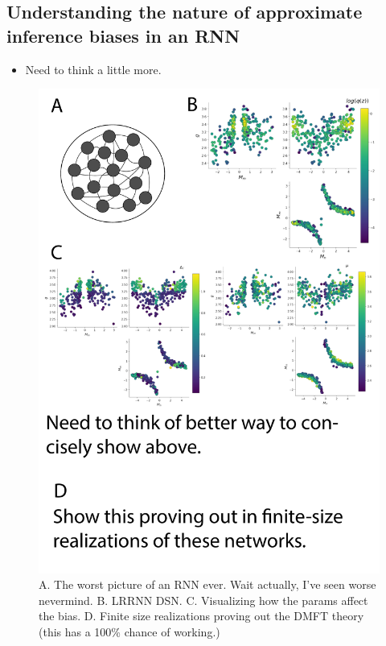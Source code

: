 \documentclass[11pt]{article}
\begin{document}
\subsection{Understanding the nature of approximate inference biases in an RNN}
\begin{itemize}
\item Need to think a little more.
\end{itemize}

\begin{figure}
\begin{center}
\includegraphics[scale=0.4]{figs/fig5/fig5.pdf}
\end{center}
\caption{A. The worst picture of an RNN ever.  Wait actually, I've seen worse nevermind. B. LRRNN DSN.  C. Visualizing how the params affect the bias.  D. Finite size realizations proving out the DMFT theory (this has a 100\% chance of working.)}
\end{figure}
\end{document}
